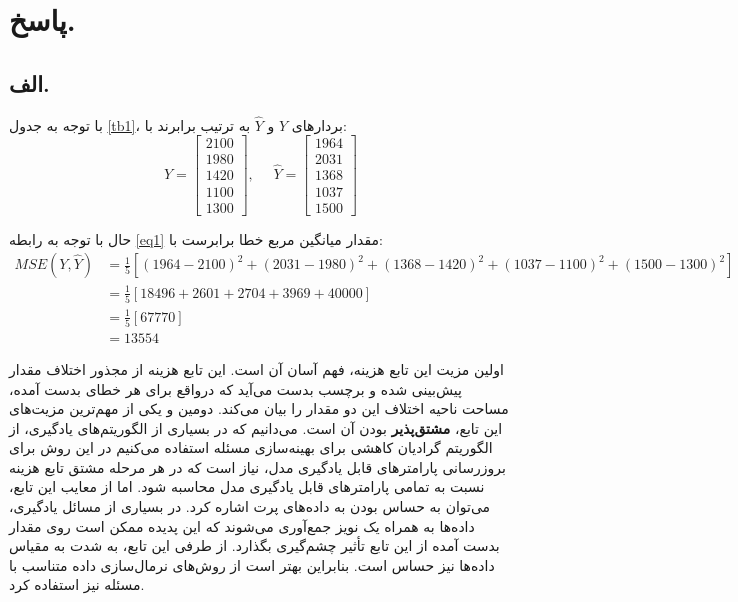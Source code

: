 \section{پاسخ.}

\subsection{الف.}
	\begin{redtext}
		با توجه به جدول \ref{tb1}، بردارهای $Y$ و $\hat{Y}$ به ترتیب برابرند با:
		\begin{equation*}
			Y = \begin{bmatrix} 2100 \\ 1980 \\ 1420 \\ 1100 \\ 1300 \end{bmatrix},\:\:\:\:\:\: \hat{Y} = \begin{bmatrix} 1964 \\ 2031 \\ 1368 \\ 1037 \\ 1500 \end{bmatrix}
		\end{equation*}
		
		حال با توجه به رابطه \ref{eq1} مقدار میانگین مربع خطا برابرست با:
	\begin{equation*}
		\begin{aligned}
			MSE(Y, \hat{Y}) & = \frac{1}{5} [ (1964 - 2100)^2 + (2031 - 1980)^2 + (1368 - 1420)^2 + (1037 - 1100)^2 + (1500 - 1300)^2 ] \\
			& = \frac{1}{5} [ 18496 + 2601 + 2704 + 3969 + 40000 ] \\
			& = \frac{1}{5} [67770]  \\
			& = 13554
		\end{aligned}
	\end{equation*}
	
	اولین مزیت این تابع هزینه، فهم آسان آن است. این تابع هزینه از مجذور اختلاف مقدار پیش‌بینی شده و برچسب بدست می‌آید که درواقع برای هر خطای بدست آمده، مساحت ناحیه اختلاف این دو مقدار را بیان می‌کند. دومین و یکی از مهم‌ترین مزیت‌های این تابع، \textbf{مشتق‌پذیر} بودن آن است. می‌دانیم که در بسیاری از الگوریتم‌های یادگیری، از الگوریتم گرادیان کاهشی برای بهینه‌سازی مسئله استفاده می‌کنیم در این روش برای بروزرسانی پارامترهای قابل یادگیری مدل، نیاز است که در هر مرحله مشتق تابع هزینه نسبت به تمامی پارامترهای قابل یادگیری مدل محاسبه شود. اما از معایب این تابع، می‌توان به حساس بودن به داده‌های پرت اشاره کرد. در بسیاری از مسائل یادگیری، داده‌ها به همراه یک نویز جمع‌آوری می‌شوند که این پدیده ممکن است روی مقدار بدست آمده از این تابع تأثیر چشم‌گیری بگذارد. از طرفی این تابع، به شدت به مقیاس داده‌ها نیز حساس است. بنابراین بهتر است از روش‌های نرمال‌سازی داده متناسب با مسئله نیز استفاده کرد.
	

\end{redtext}
